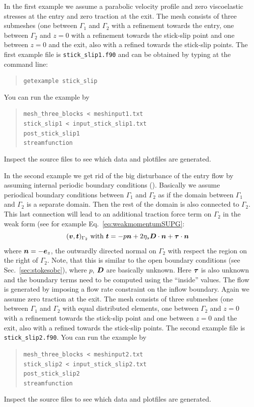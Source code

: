 In the first example we assume a parabolic velocity profile and zero
viscoelastic stresses at the entry and zero traction at the exit. The mesh
consists of three submeshes (one between $\Gamma_1$ and
 $\Gamma_2$ with a refinement
towards the entry, one between $\Gamma_2$ and $z=0$ with a refinement
towards the
stick-slip point and one between $z=0$
and the exit, also with a refined towards the stick-slip points.
The first example file is \texttt{stick\_slip1.f90} and can
be obtained by typing at the
command line:
\begin{quote}
   \texttt{getexample stick\_slip}
\end{quote}
You can run the example by
\begin{quote}
   \texttt{mesh\_three\_blocks < meshinput1.txt}\\
   \texttt{stick\_slip1 < input\_stick\_slip1.txt}\\
   \texttt{post\_stick\_slip1}\\
   \texttt{streamfunction}
\end{quote}
Inspect the source files to see which data and plotfiles are generated.

In the second example we get rid of the big disturbance of 
the entry flow by assuming internal periodic boundary conditions
(\cite{Bogaerds04}). Basically we assume periodical boundary conditions
between $\Gamma_1$ and $\Gamma_2$ as if the domain between 
$\Gamma_1$ and $\Gamma_2$ is a separate domain. Then the rest of the domain is
also connected to $\Gamma_2$. This last connection will lead to an
additional traction force term on $\Gamma_2$ in the weak form (see
for example Eq.~\eqref{eq:weakmomentumSUPG}:
\begin{equation}
   (\boldsymbol{v},\boldsymbol{t})_{\Gamma_2}\text{ with }
 \boldsymbol{t}=-p\boldsymbol{n}+2\eta_s \boldsymbol{D}\cdot\boldsymbol{n}+\boldsymbol{\tau}\cdot\boldsymbol{n}
\end{equation}
where $\boldsymbol{n}=-\boldsymbol{e}_z$, the outwardly directed normal on $\Gamma_2$ with
respect the region on the right of $\Gamma_2$. Note, that this is similar to
the open boundary conditions (see Sec.~\ref{sec:stokesobc}), where $p$, $\boldsymbol{D}$ are basically unknown. Here $\boldsymbol{\tau}$ is also unknown and the boundary terms
need to be computed using the ``inside'' values.
The flow is generated by imposing a flow rate constraint on the inflow
boundary.
Again we assume zero traction at the exit. The mesh
consists of three submeshes (one between $\Gamma_1$ and
 $\Gamma_2$ with equal distributed elements,
one between $\Gamma_2$ and $z=0$ with a refinement
towards the
stick-slip point and one between $z=0$
and the exit, also with a refined towards the stick-slip points.
The second example file is \texttt{stick\_slip2.f90}.
You can run the example by
\begin{quote}
   \texttt{mesh\_three\_blocks < meshinput2.txt}\\
   \texttt{stick\_slip2 < input\_stick\_slip2.txt}\\
   \texttt{post\_stick\_slip2}\\
   \texttt{streamfunction}
\end{quote}
Inspect the source files to see which data and plotfiles are generated.

